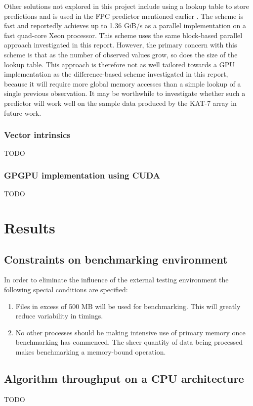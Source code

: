   Other solutions not explored in this project include using a lookup table to store predictions and is used in the FPC predictor mentioned earlier \cite{4589203}. The scheme is fast and reportedly achieves up to 
  1.36 GiB/s \cite{4976448} as a parallel implementation on a fast quad-core Xeon processor. This scheme uses the same block-based parallel approach investigated in this report. However, the primary concern with this 
  scheme is that as the number of observed values grow, so does the size of the lookup table. This approach is therefore not as well tailored towards a GPU implementation as the difference-based scheme investigated 
  in this report, because it will require more global memory accesses than a simple lookup of a single previous observation. It may be worthwhile to investigate whether such a predictor will work well on the sample data produced
  by the KAT-7 array in future work.
  \subsubsection{Vector intrinsics}
  {\color{red}TODO} 
  \subsubsection{GPGPU implementation using CUDA}
  {\color{red}TODO} 
\section{Results}
\subsection{Constraints on benchmarking environment}
In order to eliminate the influence of the external testing environment the following special conditions are specified:
\begin{enumerate}
 \item Files in excess of 500 MB will be used for benchmarking. This will greatly reduce variability in timings.
 \item No other processes should be making intensive use of primary memory once benchmarking has commenced. The sheer quantity of data being processed makes benchmarking a memory-bound operation.
\end{enumerate}
\subsection{Algorithm throughput on a CPU architecture}
{\color{red}TODO}
